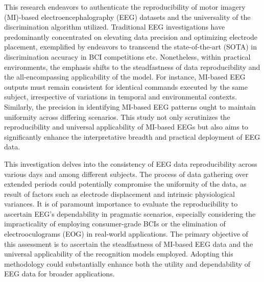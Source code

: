 \vspace{3mm}

This research endeavors to authenticate the reproducibility of motor imagery
(MI)-based electroencephalography (EEG) datasets and the universality of the
discrimination algorithm utilized\cite{zhang2018converting,chaudhary2020flexible,huang2019eeg,dumitrescu2021using}. Traditional EEG investigations have
predominantly concentrated on elevating data precision and optimizing
electrode placement, exemplified by endeavors to transcend the state-of-the-art
(SOTA) in discrimination accuracy in BCI competitions etc\cite{du2023recognition,deng2021advanced,xu2019deep,suemitsu2023effects, sharma2023recent}. Nonetheless, within practical environments, the emphasis shifts to the steadfastness of data
reproducibility and the all-encompassing applicability of the model\cite{nakamura2017ear}. For instance,
MI-based EEG outputs must remain consistent for identical
commands executed by the same subject, irrespective of variations in temporal
and environmental contexts. Similarly, the precision in identifying MI-based
EEG patterns ought to maintain uniformity across differing scenarios. This
study not only scrutinizes the reproducibility and universal applicability
of MI-based EEGs but also aims to significantly enhance the interpretative
breadth and practical deployment of EEG data.


\vspace{3mm}

This investigation delves into the consistency of EEG data reproducibility across various days and among different subjects. The process
of data gathering over extended periods could potentially compromise the uniformity
of the data, as result of factors such as electrode displacement and
intrinsic physiological variances. It is of paramount importance to evaluate
the reproducibility to ascertain EEG's dependability in pragmatic scenarios,
especially considering the impracticality of employing consumer-grade BCIs or the elimination of electrooculograms (EOG) in real-world
applications. The primary objective of this assessment is to ascertain the steadfastness
of MI-based EEG data and the universal applicability of the recognition
models employed. Adopting this methodology could substantially enhance both
the utility and dependability of EEG data for broader applications.


